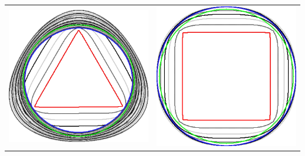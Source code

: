 \begin{frame}
{\begin{tabular}{cc}
\includegraphics[scale=0.12]{figures/graphcut/with-neighborhood-flow/radius_16/triangle.png}\hspace{3em} &
\includegraphics[scale=0.12]{figures/graphcut/with-neighborhood-flow/radius_16/square.png}\\[2em]

\end{tabular}}
\end{frame}
